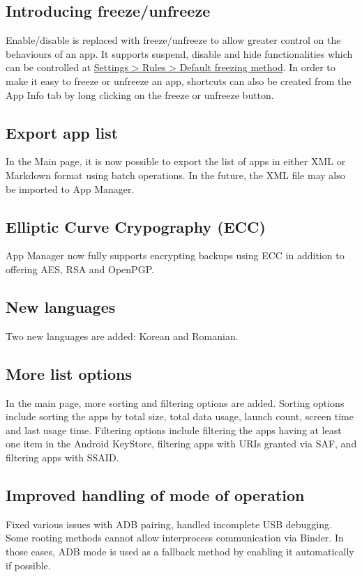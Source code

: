\subsection{Introducing freeze/unfreeze}
Enable/disable is replaced with freeze/unfreeze to allow greater control on the behaviours of an app.
It supports suspend, disable and hide functionalities which can be controlled at
\href{app-manager://settings/rules_prefs/freeze_type}{Settings > Rules > Default freezing method}.
In order to make it easy to freeze or unfreeze an app, shortcuts can also be created from the App Info tab by long clicking on the freeze or unfreeze button.

\subsection{Export app list}
In the Main page, it is now possible to export the list of apps in either XML or Markdown format using batch operations.
In the future, the XML file may also be imported to App Manager.

\subsection{Elliptic Curve Crypography (ECC)}
App Manager now fully supports encrypting backups using ECC in addition to offering AES, RSA and OpenPGP\@.

\subsection{New languages}
Two new languages are added: Korean and Romanian.

\subsection{More list options}
In the main page, more sorting and filtering options are added. Sorting options include sorting the apps by total size,
total data usage, launch count, screen time and last usage time. Filtering options include filtering the apps having
at least one item in the Android KeyStore, filtering apps with URIs granted via SAF, and filtering apps with SSAID\@.

\subsection{Improved handling of mode of operation}
Fixed various issues with ADB pairing, handled incomplete USB debugging. Some rooting methods cannot allow interprocess
communication via Binder. In those cases, ADB mode is used as a fallback method by enabling it automatically if possible.

